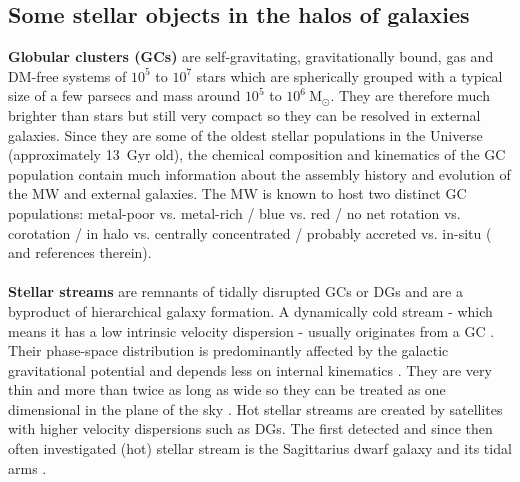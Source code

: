 \subsection{Some stellar objects in the halos of galaxies}\label{subsec:halo_objects}
\textbf{Globular clusters (\acp{GC})} are self-gravitating, gravitationally bound, gas and \ac{DM}-free systems of $10^5$ to $10^7$ stars which are spherically grouped with a typical size of a few parsecs and mass around $10^5$ to $10^6\ \mathrm{M}_\odot$. They are therefore much brighter than stars but still very compact so they can be resolved in external galaxies. Since they are some of the oldest stellar populations in the Universe (approximately \SI{13}{Gyr} old), the chemical composition and kinematics of the \ac{GC} population contain much information about the assembly history and evolution of the \ac{MW} and external galaxies. The \ac{MW} is known to host two distinct \ac{GC} populations: metal-poor vs. metal-rich / blue vs. red / no net rotation vs. corotation / in halo vs. centrally concentrated / probably accreted vs. in-situ (\citealp{Renaud...MWGCs....2017} and references therein). \\\\
\textbf{Stellar streams} are remnants of tidally disrupted \acp{GC} or \acp{DG} and are a byproduct of hierarchical galaxy formation. A dynamically cold stream - which means it has a low intrinsic velocity dispersion - usually originates from a \ac{GC} \citep{Bonaca...streamsinfo...2018}. Their phase-space distribution is predominantly affected by the galactic gravitational potential and depends less on internal kinematics \citep{Kupper...streams...2010, Kupper...streams...2012}. They are very thin and more than twice as long as wide so they can be treated as one dimensional in the plane of the sky \citep{Bonaca...streamsinfo...2018}. Hot stellar streams are created by satellites with higher velocity dispersions such as \acp{DG}. The first detected and since then often investigated (hot) stellar stream is the Sagittarius dwarf galaxy and its tidal arms \citep{Ibata...Sagittarius....1994}.\\
